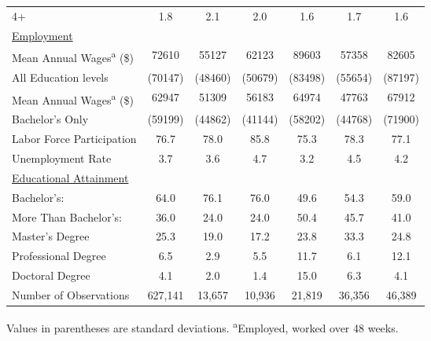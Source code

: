 \documentclass[11pt]{article}
\theoremstyle{definition}
\begin{document}
{\begin{center}
\begin{tabular}{l c c c c c c}
\hspace{2.5mm}4+ & 1.8 & 2.1 & 2.0 & 1.6 & 1.7 & 1.6 \\
\underline{Employment} & & & & & & \\
Mean Annual Wages\textsuperscript{a} (\$) & 72610  & 55127 & 62123 & 89603 & 57358 & 82605 \\
\hspace{2.5mm}All Education levels & (70147) & (48460) & (50679) & (83498) & (55654) & (87197) \\
Mean Annual Wages\textsuperscript{a} (\$) & 62947 & 51309 & 56183 & 64974 & 47763 & 67912 \\
\hspace{2.5mm}Bachelor's Only & (59199) & (44862) & (41144) & (58202) & (44768) & (71900) \\
Labor Force Participation & 76.7 & 78.0 & 85.8 & 75.3 & 78.3 & 77.1 \\
Unemployment Rate & 3.7 & 3.6 & 4.7 & 3.2 & 4.5 & 4.2 \\
\underline{Educational Attainment}  &  &  &  &  &  &  \\
Bachelor's:  & 64.0 & 76.1 & 76.0 & 49.6 & 54.3 & 59.0 \\
More Than Bachelor's:  & 36.0 & 24.0 & 24.0 & 50.4 & 45.7 & 41.0 \\
\hspace{2.5mm}Master's Degree & 25.3 & 19.0 & 17.2 & 23.8 & 33.3 & 24.8 \\
\hspace{2.5mm}Professional Degree & 6.5 & 2.9 & 5.5 & 11.7 & 6.1 & 12.1 \\
\hspace{2.5mm}Doctoral Degree & 4.1 & 2.0 & 1.4 & 15.0 & 6.3 & 4.1 \\
\hline
Number of Observations & 627,141 & 13,657 & 10,936 & 21,819 & 36,356 & 46,389 \\
\hline\hline
\end{tabular} 
\end{center}} 
\small{Values in parentheses are standard deviations. \textsuperscript{a}Employed, worked over 48 weeks.}
\end{document}
